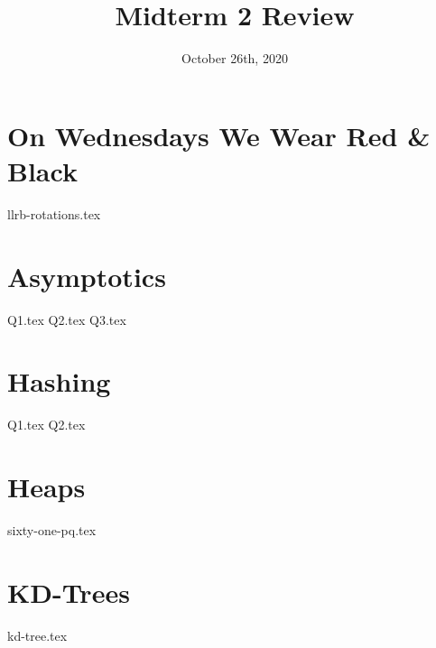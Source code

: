 \documentclass[11pt]{exam}
\title{Midterm 2 Review}
\date{October 26th, 2020}
\begin{document}
\maketitle

\section{On Wednesdays We Wear Red \& Black}
\begin{questions}
{llrb-rotations.tex}

\end{questions}

\section{Asymptotics}
\begin{questions}
{Q1.tex}
{Q2.tex}
\newpage
{Q3.tex}

\end{questions}

\newpage
\section{Hashing}
\begin{questions}
{Q1.tex}
{Q2.tex}

\end{questions}

\newpage
\section{Heaps}
\begin{questions}
{sixty-one-pq.tex}

\end{questions}

\newpage
\section{KD-Trees}
\begin{questions}
{kd-tree.tex}

\end{questions}
\end{document}
